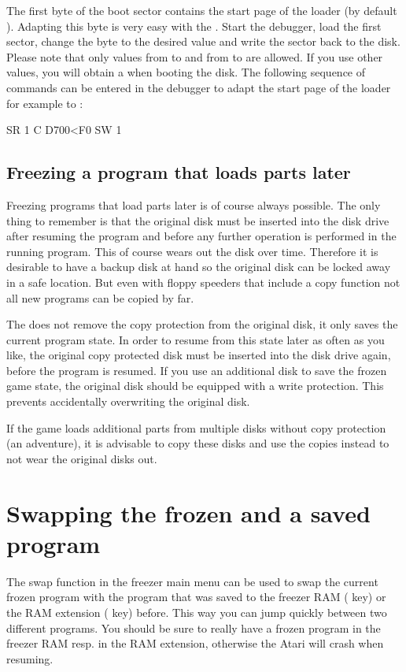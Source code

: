 The first byte of the boot sector contains the start page of the loader (by
default ). Adapting this byte is very easy with the \frz.
Start the debugger, load the first sector, change the byte to the desired value
and write the sector back to the disk. Please note that only values from
 to  and from  to  are allowed. If you use
other values, you will obtain a  when booting the disk.
The following sequence of commands can be entered in the debugger to adapt the
start page of the loader for example to :

\begin{fcode}
SR 1
C D700<F0
SW 1
\end{fcode}

\subsection{Freezing a program that loads parts later }
Freezing programs that load parts later is of course always possible. The only
thing to remember is that the original disk must be inserted into the disk drive
after resuming the program and before any further operation is performed in the
running program. This of course wears out the disk over time. Therefore it is
desirable to have a backup disk at hand so the original disk can be locked away
in a safe location. But even with floppy speeders that include a copy function
not all new programs can be copied by far.

The \frz does not remove the copy protection from the original disk, it only
saves the current program state. In order to resume from this state later as
often as you like, the original copy protected disk must be inserted into the
disk drive again, before the program is resumed. If you use an additional disk to
save the frozen game state, the original disk should be equipped with a write
protection. This prevents accidentally overwriting the original disk.

If the game loads additional parts from multiple disks without copy protection
(\eg an adventure), it is advisable to copy these disks and use the copies
instead to not wear the original disks out.
\clearpage

\section{Swapping the frozen and a saved program}
The swap function in the freezer main menu can be used to swap the current
frozen program with the program that was saved to the freezer RAM (
key) or the RAM extension ( key) before. This way you can jump quickly
between two different programs. You should be sure to really have a frozen
program in the freezer RAM resp. in the RAM extension, otherwise the Atari will
crash when resuming.

